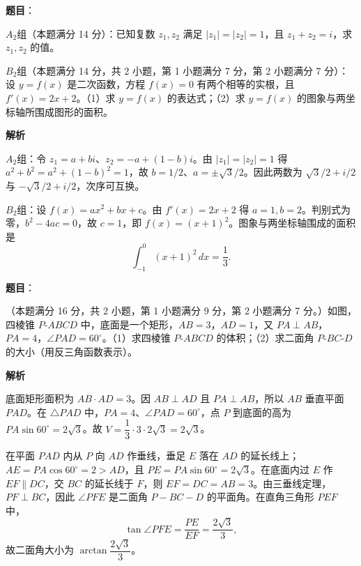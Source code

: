 \begin{answer}

\textbf{题目}：

$A_2$组（本题满分 14 分）：已知复数 $z_1,z_2$ 满足 $|z_1|=|z_2|=1$，且 $z_1+z_2=i$，求 $z_1,z_2$ 的值。

$B_2$组（本题满分 14 分，共 2 小题，第 1 小题满分 7 分，第 2 小题满分 7 分）：设 $y=f(x)$ 是二次函数，方程 $f(x)=0$ 有两个相等的实根，且 $f'(x)=2x+2$。（1）求 $y=f(x)$ 的表达式；（2）求 $y=f(x)$ 的图象与两坐标轴所围成图形的面积。

\textbf{解析}

$A_2$组：令 $z_1=a+bi$、$z_2=-a+(1-b)i$。由 $|z_1|=|z_2|=1$ 得 $a^2+b^2=a^2+(1-b)^2=1$，故 $b=1/2$、$a=\pm\sqrt3/2$。因此两数为 $\sqrt3/2+i/2$ 与 $-\sqrt3/2+i/2$，次序可互换。

$B_2$组：设 $f(x)=ax^2+bx+c$。由 $f'(x)=2x+2$ 得 $a=1,b=2$。判别式为零，$b^2-4ac=0$，故 $c=1$，即 $f(x)=(x+1)^2$。图象与两坐标轴围成的面积是
\nopagebreak[4]
\[
\int_{-1}^{0}(x+1)^2\,dx=\frac13.
\]


\end{answer}
\begin{answer}

\textbf{题目}：

（本题满分 16 分，共 2 小题，第 1 小题满分 9 分，第 2 小题满分 7 分。）如图，四棱锥 $P\text{-}ABCD$ 中，底面是一个矩形，$AB=3$，$AD=1$，又 $PA\perp AB$，$PA=4$，$\angle PAD=60^\circ$。（1）求四棱锥 $P\text{-}ABCD$ 的体积；（2）求二面角 $P\text{-}BC\text{-}D$ 的大小（用反三角函数表示）。
\nopagebreak[4]
\begin{center}\end{center}
\nopagebreak[4]
\textbf{解析}

底面矩形面积为 $AB\cdot AD=3$。因 $AB\perp AD$ 且 $PA\perp AB$，所以 $AB$ 垂直平面 $PAD$。在 $\triangle PAD$ 中，$PA=4$、$\angle PAD=60^\circ$，点 $P$ 到底面的高为 $PA\sin60^\circ=2\sqrt3$。故 $V=\dfrac13\cdot3\cdot2\sqrt3=2\sqrt3$。

在平面 $PAD$ 内从 $P$ 向 $AD$ 作垂线，垂足 $E$ 落在 $AD$ 的延长线上；$AE=PA\cos60^\circ=2>AD$，且 $PE=PA\sin60^\circ=2\sqrt3$。在底面内过 $E$ 作 $EF\parallel DC$，交 $BC$ 的延长线于 $F$，则 $EF=DC=AB=3$。由三垂线定理，$PF\perp BC$，因此 $\angle PFE$ 是二面角 $P-BC-D$ 的平面角。在直角三角形 $PEF$ 中，
\nopagebreak[4]
\[
\tan\angle PFE=\frac{PE}{EF}=\frac{2\sqrt3}{3},
\]
故二面角大小为 $\arctan\dfrac{2\sqrt3}{3}$。
\nopagebreak[4]
\begin{center}\end{center}
\nopagebreak[4]

\end{answer}
